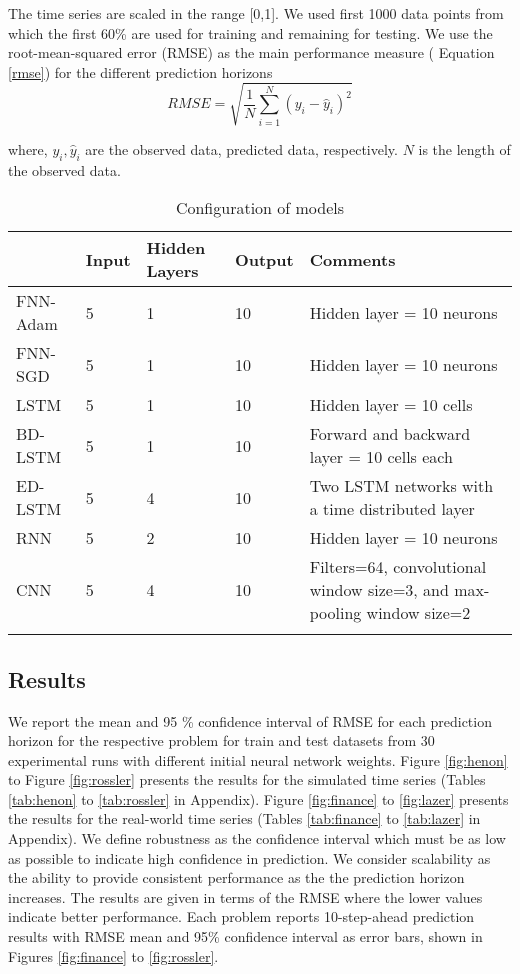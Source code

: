 \documentclass{ieeeaccess}
\begin{document}
The  time series  are  scaled in the range [0,1].  We used first 1000 data points  from which the first 60\% are used for training and remaining for testing. We use the root-mean-squared error (RMSE)   as the main performance measure ( Equation \ref{rmse})
for the different prediction horizons  
\begin{equation} 
RMSE =  \sqrt{\frac{ 1}{N }   \sum_{i=1}^{N} (y_i - \hat{y}_i)^2}
\label{rmse}  
\end{equation} 
 
 
\noindent where, $y_i, \hat{y}_i$   are the observed data,
predicted data, respectively. $N$ is the length of the observed data. 
 
 
\begin{table*}[htbp!]
 \small 
 \centering
 \caption{Configuration of models }
\label{tab:config}
\begin{tabular}{llllp{11cm}}
\hline
 &  Input & Hidden Layers & Output & Comments  \\
\hline
\hline
FNN-Adam &      5&1&10& Hidden layer =  10 neurons\\
FNN-SGD & 5 & 1&10& Hidden layer = 10 neurons\\

LSTM &      5&1&10& Hidden layer = 10 cells \\
BD-LSTM &      5&1&10&Forward and backward layer = 10 cells each \\
ED-LSTM&      5&4&10& Two LSTM networks with a time distributed layer \\
RNN &      5&2&10& Hidden layer = 10 neurons \\
CNN &      5&4&10&  Filters=64, convolutional window size=3, and max-pooling window size=2\\ 

\hline &
\end{tabular}

\end{table*}

 
 
 
\subsection{Results}

 We report the mean and 95 \% confidence interval of RMSE for each prediction horizon for the respective problem  for train and test datasets from 30 experimental runs with different initial neural network weights. Figure \ref{fig:henon} to Figure  \ref{fig:rossler} presents the results for the simulated time series  (Tables \ref{tab:henon} to \ref{tab:rossler} in Appendix). Figure \ref{fig:finance} to \ref{fig:lazer} presents the results for the real-world time series   (Tables \ref{tab:finance} to \ref{tab:lazer} in Appendix). We define robustness as the confidence interval which must be as low as possible to indicate high confidence in prediction. We consider scalability as the ability to provide consistent performance as the the prediction horizon increases. The results are given in terms of the RMSE where the lower values indicate better performance. Each problem reports 10-step-ahead prediction results  with RMSE mean and 95\% confidence interval  as  error bars, shown in Figures \ref{fig:finance} to \ref{fig:rossler}. 
\end{document}
